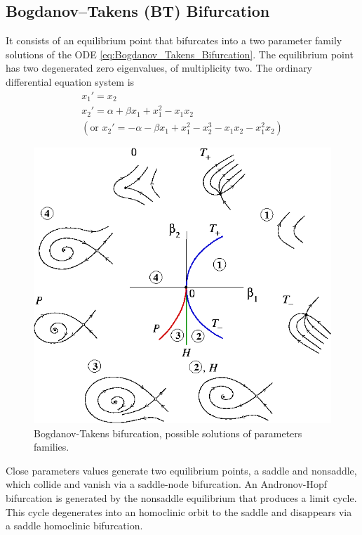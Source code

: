 \subsection{Bogdanov–Takens (BT) Bifurcation}\label{Bogdanov_Takens_Bifurcation}

It consists of an equilibrium point that bifurcates into a two parameter family solutions of the ODE \eqref{eq:Bogdanov_Takens_Bifurcation}. The equilibrium point has two degenerated zero eigenvalues, of multiplicity two. The ordinary differential equation system is
\begin{gather}\label{eq:Bogdanov_Takens_Bifurcation}
    x_1' = x_2\nonumber\\
    x_2 ' = \alpha + \beta x_1 + x_1^2-x_1x_2 \\
    (\text{or }x_2 '=-\alpha -\beta x_1 + x_1^2-x_2^3-x_1x_2-x_1^2x_2) \nonumber
\end{gather}


\begin{figure}[H]
    \centering
    \includegraphics[scale=0.75]{Images/BogdanovTakens.png}
    \caption{Bogdanov-Takens bifurcation, possible solutions of parameters families.}
    \label{fig:takens}
\end{figure}

Close parameters values generate two equilibrium points, a saddle and nonsaddle, which collide and vanish via a saddle-node bifurcation. An Andronov-Hopf bifurcation is generated by the nonsaddle equilibrium that produces a limit cycle. This cycle degenerates into an homoclinic orbit to the saddle and disappears via a saddle homoclinic bifurcation. \cite{bifurcations_book, bifurcation}


